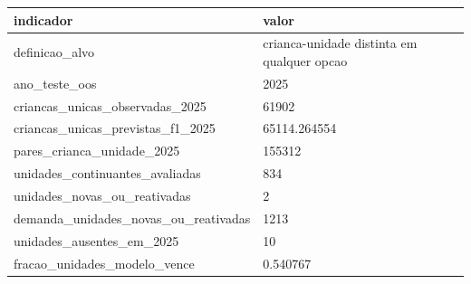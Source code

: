 \begin{tabular}{ll}
\toprule
indicador & valor \\
\midrule
definicao_alvo & crianca-unidade distinta em qualquer opcao \\
ano_teste_oos & 2025 \\
criancas_unicas_observadas_2025 & 61902 \\
criancas_unicas_previstas_f1_2025 & 65114.264554 \\
pares_crianca_unidade_2025 & 155312 \\
unidades_continuantes_avaliadas & 834 \\
unidades_novas_ou_reativadas & 2 \\
demanda_unidades_novas_ou_reativadas & 1213 \\
unidades_ausentes_em_2025 & 10 \\
fracao_unidades_modelo_vence & 0.540767 \\
\bottomrule
\end{tabular}
